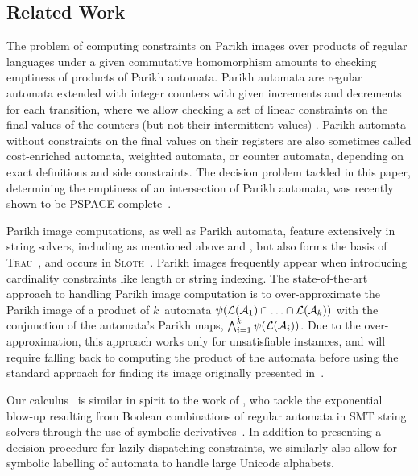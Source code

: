 \subsection{Related Work}

The problem of computing constraints on Parikh images over products of regular
languages under a given commutative homomorphism amounts to checking emptiness
of products of
Parikh automata. Parikh automata are regular automata extended with integer
counters with given increments and decrements for each transition, where we
allow checking a set of linear constraints on the final values of the counters
(but not their intermittent values) \cite{parikh-automata}. Parikh automata
without constraints on the final values on their registers are also sometimes
called cost-enriched automata, weighted automata, or counter automata, depending
on exact definitions and side constraints. The decision problem tackled in this
paper, determining the emptiness of an intersection of Parikh automata, was
recently shown to be PSPACE-complete~\cite{graph-queries}.

Parikh image computations, as well as Parikh automata, feature extensively in
string solvers, including as mentioned above \Ostrich{} and \OstrichPlus{}
\cite{ostrich,ostrich-plus}, but also forms the basis of
\textsc{Trau}~\cite{trau-pldi},
and occurs in \textsc{Sloth}~\cite{sloth}. Parikh images frequently appear when
introducing cardinality constraints like length or string indexing. The
state-of-the-art approach to handling Parikh image computation is to
over-approximate the Parikh image of a product of $k$~automata
$\operatorname{\psi}(\operatorname{\mathcal{L}}(\mathcal{A}_1) \cap \ldots \cap \operatorname{\mathcal{L}}(\mathcal{A}_k))$
with the conjunction of the automata's Parikh maps, $\bigwedge_{i=1}^{k}
\operatorname{\psi}(\operatorname{\mathcal{L}}(\mathcal{A}_i))$. Due to the over-approximation,
this approach works only for unsatisfiable instances,
and will require falling back to computing the product of the automata before
using the standard approach for finding its image originally presented
in~\cite{generate-parikh-image}.

Our calculus~\Calculus{} is similar in spirit to the work
of \citeauthor{symbolic-boolean-derivatives}, who tackle the exponential
blow-up resulting from Boolean combinations
of regular automata in SMT string solvers
through the use of symbolic derivatives~\cite{symbolic-boolean-derivatives}.
In addition to presenting a decision procedure for lazily dispatching
constraints, we similarly also allow for symbolic labelling of automata to
handle large Unicode alphabets.

